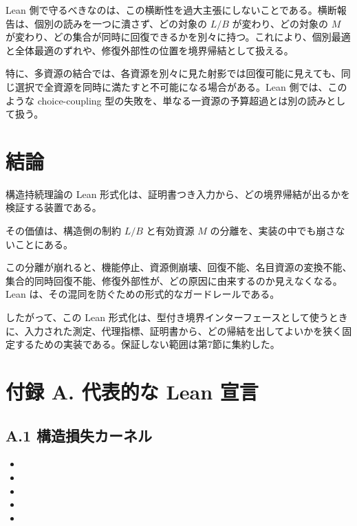 \documentclass[12pt,a4paper]{article}
\begin{document}
Lean 側で守るべきなのは、この横断性を過大主張にしないことである。横断報告は、個別の読みを一つに潰さず、どの対象の \(L/B\) が変わり、どの対象の \(M\) が変わり、どの集合が同時に回復できるかを別々に持つ。これにより、個別最適と全体最適のずれや、修復外部性の位置を境界帰結として扱える。

特に、多資源の結合では、各資源を別々に見た射影では回復可能に見えても、同じ選択で全資源を同時に満たすと不可能になる場合がある。Lean 側では、このような choice-coupling 型の失敗を、単なる一資源の予算超過とは別の読みとして扱う。

\section{結論}\label{ux7d50ux8ad6}

構造持続理論の Lean 形式化は、証明書つき入力から、どの境界帰結が出るかを検証する装置である。

その価値は、構造側の制約 \(L/B\) と有効資源 \(M\) の分離を、実装の中でも崩さないことにある。

この分離が崩れると、機能停止、資源側崩壊、回復不能、名目資源の変換不能、集合的同時回復不能、修復外部性が、どの原因に由来するのか見えなくなる。Lean は、その混同を防ぐための形式的なガードレールである。

したがって、この Lean 形式化は、型付き境界インターフェースとして使うときに、入力された測定、代理指標、証明書から、どの帰結を出してよいかを狭く固定するための実装である。保証しない範囲は第7節に集約した。

\section{付録 A. 代表的な Lean 宣言}\label{ux4ed8ux9332-a.-ux4ee3ux8868ux7684ux306a-lean-ux5ba3ux8a00}

\subsection{A.1 構造損失カーネル}\label{a.1-ux69cbux9020ux640dux5931ux30abux30fcux30cdux30eb}

\begin{itemize}
\tightlist
\item
  {\scriptsize{}}
\item
  {\scriptsize{}}
\item
  {\scriptsize{}}
\item
  {\scriptsize{}}
\item
  {\scriptsize{}}
\end{itemize}
\end{document}
